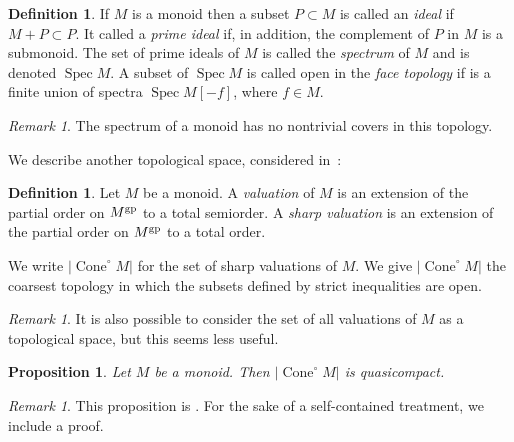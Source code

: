 \documentclass[12pt]{amsart}
\newtheorem{proposition}[theorem]{Proposition}
\theoremstyle{definition}
\newtheorem{definition}[theorem]{Definition}
\theoremstyle{remark}
\newtheorem{remark}[theorem]{Remark}
\def\Cone{\operatorname{Cone}}
\def\Spec{\operatorname{Spec}}
\begin{document}
\begin{definition} \label{def:ideals}
If $M$ is a monoid then a subset $P \subset M$ is called an \emph{ideal} if $M + P \subset P$.  It called a \emph{prime ideal} if, in addition, the complement of $P$ in $M$ is a submonoid.  The set of prime ideals of $M$ is called the \emph{spectrum} of $M$ and is denoted $\Spec M$.  A subset of $\Spec M$ is called open in the \emph{face topology} if is a finite union of spectra $\Spec M[-f]$, where $f \in M$.
\end{definition}

\begin{remark}
The spectrum of a monoid has no nontrivial covers in this topology.
\end{remark}

We describe another topological space, considered in~\cite{logpic}:

\begin{definition}
Let $M$ be a monoid.  A \emph{valuation} of $M$ is an extension of the partial order on $M^{\rm gp}$ to a total semiorder.  A \emph{sharp valuation} is an extension of the partial order on $M^{\rm gp}$ to a total order.

We write $|\Cone^\circ M|$ for the set of sharp valuations of $M$.  We give $|\Cone^\circ M|$ the coarsest topology in which the subsets defined by strict inequalities are open.
\end{definition}

\begin{remark}
It is also possible to consider the set of all valuations of $M$ as a topological space, but this seems less useful.
\end{remark}

\begin{proposition}
Let $M$ be a monoid.  Then $|\Cone^\circ M|$ is quasicompact.
\end{proposition}

\begin{remark}
This proposition is \cite[Proposition~2.3.2.3]{logpic}.  For the sake of a self-contained treatment, we include a proof.
\end{remark}
\end{document}
